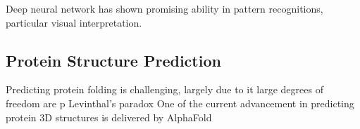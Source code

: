 Deep neural network has shown promising ability in pattern recognitions, particular visual interpretation.
\par 

\subsection{Protein Structure Prediction}
Predicting protein folding is challenging, largely due to it large degrees of freedom  are p Levinthal's paradox One of the current advancement in predicting protein 3D structures is delivered by AlphaFold